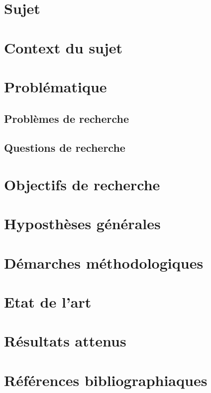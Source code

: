 \documentclass[a4paper,12pt]{article}
\begin{document}
\section[Sujet]{Sujet}

\section[Context du sujet]{Context du sujet}

\section[Problématique]{Problématique}
\subsection[Problèmes de recherche]{Problèmes de recherche}
\subsection[Questions de recherche]{Questions de recherche}

\section[Objectifs de recherche]{Objectifs de recherche}

\section[Hyposthèses générales]{Hyposthèses générales}


\section[Démarches méthodologiques]{Démarches méthodologiques}

\section[Etat de l'art]{Etat de l'art}

\section[Résultats attenus]{Résultats attenus}

\section[Références bibliographiaques]{Références bibliographiaques}
\end{document}
